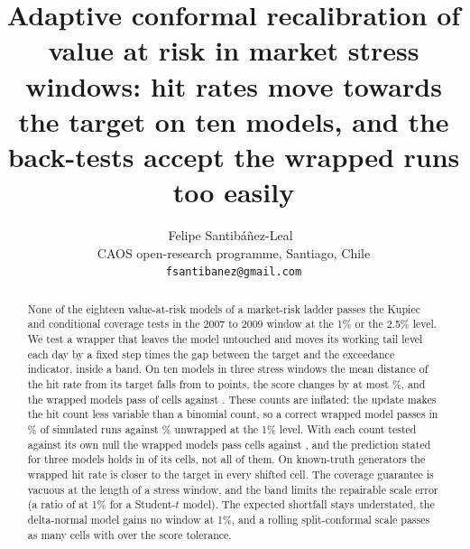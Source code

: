 \documentclass[11pt]{article}
\title{Adaptive conformal recalibration of value at risk in market stress windows: hit rates move towards the target on ten models, and the back-tests accept the wrapped runs too easily}
\author{Felipe Santib\'a\~nez-Leal~\orcidlink{0000-0002-0150-3246}\\
\small CAOS open-research programme, Santiago, Chile\\
\small \texttt{fsantibanez@gmail.com}}
\date{\docdate}
\begin{document}
\maketitle
\headerblock

\begin{abstract}
None of the eighteen value-at-risk models of a market-risk ladder passes the Kupiec and conditional coverage tests in the 2007 to 2009 window at the 1\% or the 2.5\% level.
We test a wrapper that leaves the model untouched and moves its working tail level each day by a fixed step times the gap between the target and the exceedance indicator, inside a band.
On ten models in three stress windows the mean distance of the hit rate from its target falls from \tenHitDevUnw{} to \tenHitDevAci{} points, the score changes by at most \tenWorstFz\%, and the wrapped models pass \tenPassAci{} of \tenRuns{} cells against \tenPassUnw{}.
These counts are inflated: the update makes the hit count less variable than a binomial count, so a correct wrapped model passes in \dispBOneOneAciPass\% of simulated runs against \dispBOneOneUnwPass\% unwrapped at the 1\% level. With each count tested against its own null the wrapped models pass \dispCWrapCal{} cells against \dispCUnwExact{}, and the prediction stated for three models holds in \dispCHoneGainCal{} of its \hypCells{} cells, not all of them.
On known-truth generators the wrapped hit rate is closer to the target in every shifted cell.
The coverage guarantee is vacuous at the length of a stress window, and the band limits the repairable scale error (a ratio of \thCCmaxOne{} at 1\% for a Student-$t$ model).
The expected shortfall stays understated, the delta-normal model gains no window at 1\%, and a rolling split-conformal scale passes as many cells with \cmpRollTenFzOver{} over the score tolerance.
\end{abstract}
















\end{document}
